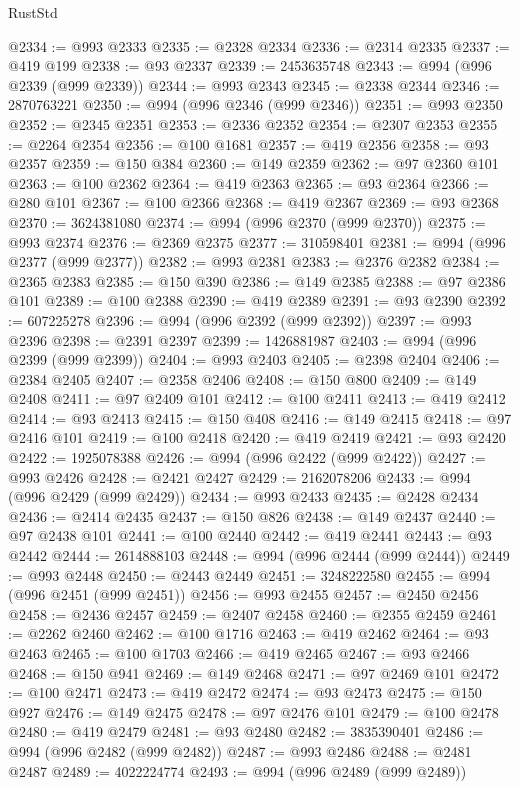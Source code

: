 \begin{lexlean}{RustStd}
\begin{coremodule}
@2334 := @993 @2333
@2335 := @2328 @2334
@2336 := @2314 @2335
@2337 := @419 @199
@2338 := @93 @2337
@2339 := 2453635748
@2343 := @994 (@996 @2339 (@999 @2339))
@2344 := @993 @2343
@2345 := @2338 @2344
@2346 := 2870763221
@2350 := @994 (@996 @2346 (@999 @2346))
@2351 := @993 @2350
@2352 := @2345 @2351
@2353 := @2336 @2352
@2354 := @2307 @2353
@2355 := @2264 @2354
@2356 := @100 @1681
@2357 := @419 @2356
@2358 := @93 @2357
@2359 := @150 @384
@2360 := @149 @2359
@2362 := @97 @2360 @101
@2363 := @100 @2362
@2364 := @419 @2363
@2365 := @93 @2364
@2366 := @280 @101
@2367 := @100 @2366
@2368 := @419 @2367
@2369 := @93 @2368
@2370 := 3624381080
@2374 := @994 (@996 @2370 (@999 @2370))
@2375 := @993 @2374
@2376 := @2369 @2375
@2377 := 310598401
@2381 := @994 (@996 @2377 (@999 @2377))
@2382 := @993 @2381
@2383 := @2376 @2382
@2384 := @2365 @2383
@2385 := @150 @390
@2386 := @149 @2385
@2388 := @97 @2386 @101
@2389 := @100 @2388
@2390 := @419 @2389
@2391 := @93 @2390
@2392 := 607225278
@2396 := @994 (@996 @2392 (@999 @2392))
@2397 := @993 @2396
@2398 := @2391 @2397
@2399 := 1426881987
@2403 := @994 (@996 @2399 (@999 @2399))
@2404 := @993 @2403
@2405 := @2398 @2404
@2406 := @2384 @2405
@2407 := @2358 @2406
@2408 := @150 @800
@2409 := @149 @2408
@2411 := @97 @2409 @101
@2412 := @100 @2411
@2413 := @419 @2412
@2414 := @93 @2413
@2415 := @150 @408
@2416 := @149 @2415
@2418 := @97 @2416 @101
@2419 := @100 @2418
@2420 := @419 @2419
@2421 := @93 @2420
@2422 := 1925078388
@2426 := @994 (@996 @2422 (@999 @2422))
@2427 := @993 @2426
@2428 := @2421 @2427
@2429 := 2162078206
@2433 := @994 (@996 @2429 (@999 @2429))
@2434 := @993 @2433
@2435 := @2428 @2434
@2436 := @2414 @2435
@2437 := @150 @826
@2438 := @149 @2437
@2440 := @97 @2438 @101
@2441 := @100 @2440
@2442 := @419 @2441
@2443 := @93 @2442
@2444 := 2614888103
@2448 := @994 (@996 @2444 (@999 @2444))
@2449 := @993 @2448
@2450 := @2443 @2449
@2451 := 3248222580
@2455 := @994 (@996 @2451 (@999 @2451))
@2456 := @993 @2455
@2457 := @2450 @2456
@2458 := @2436 @2457
@2459 := @2407 @2458
@2460 := @2355 @2459
@2461 := @2262 @2460
@2462 := @100 @1716
@2463 := @419 @2462
@2464 := @93 @2463
@2465 := @100 @1703
@2466 := @419 @2465
@2467 := @93 @2466
@2468 := @150 @941
@2469 := @149 @2468
@2471 := @97 @2469 @101
@2472 := @100 @2471
@2473 := @419 @2472
@2474 := @93 @2473
@2475 := @150 @927
@2476 := @149 @2475
@2478 := @97 @2476 @101
@2479 := @100 @2478
@2480 := @419 @2479
@2481 := @93 @2480
@2482 := 3835390401
@2486 := @994 (@996 @2482 (@999 @2482))
@2487 := @993 @2486
@2488 := @2481 @2487
@2489 := 4022224774
@2493 := @994 (@996 @2489 (@999 @2489))

\end{coremodule}
\end{lexlean}
